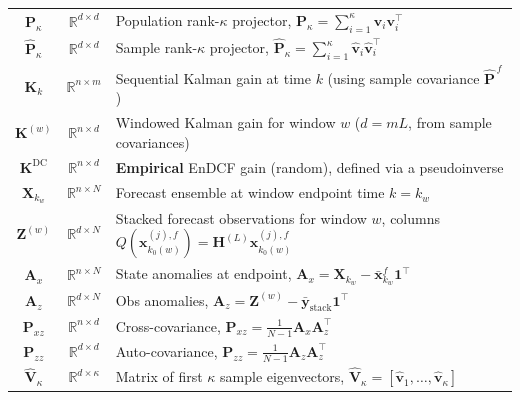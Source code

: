 \documentclass[11pt,a4paper]{article}
\begin{document}
\begin{table}[H]
{\begin{tabular}{ccl}
$\mathbf{P}_\kappa$ & $\mathbb{R}^{d\times d}$ & Population rank-$\kappa$ projector, $\mathbf{P}_\kappa=\sum_{i=1}^\kappa \mathbf{v}_i\mathbf{v}_i^\top$ \\
$\hat{\mathbf{P}}_\kappa$ & $\mathbb{R}^{d\times d}$ & Sample rank-$\kappa$ projector, $\hat{\mathbf{P}}_\kappa=\sum_{i=1}^\kappa \hat{\mathbf{v}}_i\hat{\mathbf{v}}_i^\top$ \\
$\mathbf{K}_k$ & $\mathbb{R}^{n\times m}$ & Sequential Kalman gain at time $k$ (using sample covariance $\widehat{\mathbf{P}}^{\,f}$) \\
$\mathbf{K}^{(w)}$ & $\mathbb{R}^{n\times d}$ & Windowed Kalman gain for window $w$ ($d=mL$, from sample covariances) \\
$\mathbf{K}^{\mathrm{DC}}$ & $\mathbb{R}^{n\times d}$ & \textbf{Empirical} EnDCF gain (random), defined via a pseudoinverse \\
$\mathbf{X}_{k_w}$ & $\mathbb{R}^{n\times N}$ & Forecast ensemble at window endpoint time $k=k_w$ \\
$\mathbf{Z}^{(w)}$ & $\mathbb{R}^{d\times N}$ & Stacked forecast observations for window $w$, columns $Q(\mathbf{x}_{k_0(w)}^{(j),f})=\mathbf{H}^{(L)}\mathbf{x}_{k_0(w)}^{(j),f}$ \\
$\mathbf{A}_x$ & $\mathbb{R}^{n\times N}$ & State anomalies at endpoint, $\mathbf{A}_x=\mathbf{X}_{k_w}-\bar{\mathbf{x}}_{k_w}^f\mathbf{1}^\top$ \\
$\mathbf{A}_z$ & $\mathbb{R}^{d\times N}$ & Obs anomalies, $\mathbf{A}_z=\mathbf{Z}^{(w)}-\bar{\mathbf{y}}_{\mathrm{stack}}\mathbf{1}^\top$ \\
$\mathbf{P}_{xz}$ & $\mathbb{R}^{n\times d}$ & Cross-covariance, $\mathbf{P}_{xz}=\frac{1}{N-1}\mathbf{A}_x\mathbf{A}_z^\top$ \\
$\mathbf{P}_{zz}$ & $\mathbb{R}^{d\times d}$ & Auto-covariance, $\mathbf{P}_{zz}=\frac{1}{N-1}\mathbf{A}_z\mathbf{A}_z^\top$ \\
$\hat{\mathbf{V}}_\kappa$ & $\mathbb{R}^{d\times \kappa}$ & Matrix of first $\kappa$ sample eigenvectors, $\hat{\mathbf{V}}_\kappa=[\hat{\mathbf{v}}_1,\ldots,\hat{\mathbf{v}}_\kappa]$ \\
\bottomrule
\end{tabular}%
}
\end{table}



\FloatBarrier

\end{document}
